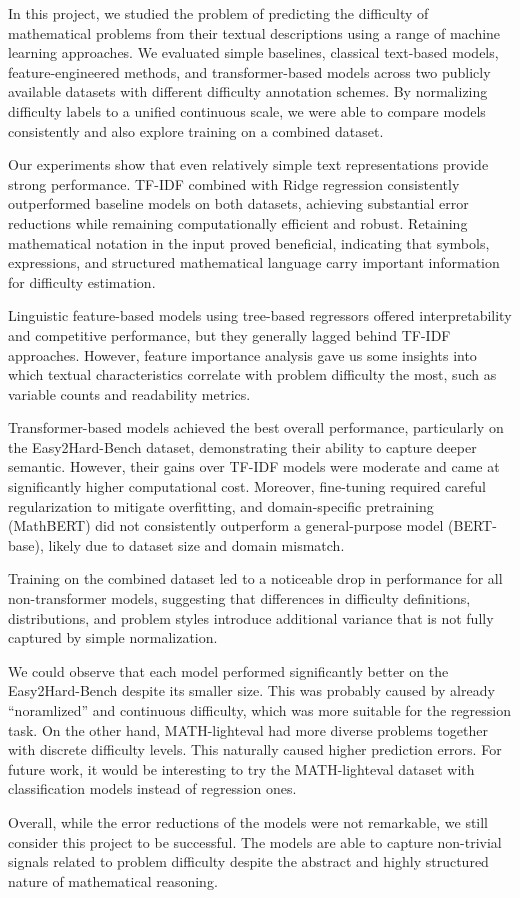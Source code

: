 \documentclass[runningheads]{llncs}
\begin{document}
In this project, we studied the problem of predicting the difficulty of mathematical problems from their textual descriptions using a range of machine learning approaches. We evaluated simple baselines, classical text-based models, feature-engineered methods, and transformer-based models across two publicly available datasets with different difficulty annotation schemes. By normalizing difficulty labels to a unified continuous scale, we were able to compare models consistently and also explore training on a combined dataset.

Our experiments show that even relatively simple text representations provide strong performance. TF-IDF combined with Ridge regression consistently outperformed baseline models on both datasets, achieving substantial error reductions while remaining computationally efficient and robust. Retaining mathematical notation in the input proved beneficial, indicating that symbols, expressions, and structured mathematical language carry important information for difficulty estimation.

Linguistic feature-based models using tree-based regressors offered interpretability and competitive performance, but they generally lagged behind TF-IDF approaches. However, feature importance analysis gave us some insights into which textual characteristics correlate with problem difficulty the most, such as variable counts and readability metrics.

Transformer-based models achieved the best overall performance, particularly on the Easy2Hard-Bench dataset, demonstrating their ability to capture deeper semantic. However, their gains over TF-IDF models were moderate and came at significantly higher computational cost. Moreover, fine-tuning required careful regularization to mitigate overfitting, and domain-specific pretraining (MathBERT) did not consistently outperform a general-purpose model (BERT-base), likely due to dataset size and domain mismatch.

Training on the combined dataset led to a noticeable drop in performance for all non-transformer models, suggesting that differences in difficulty definitions, distributions, and problem styles introduce additional variance that is not fully captured by simple normalization.

We could observe that each model performed significantly better on the Easy2Hard-Bench despite its smaller size. This was probably caused by already ``noramlized'' and continuous difficulty, which was more suitable for the regression task. On the other hand, MATH-lighteval had more diverse problems together with discrete difficulty levels. This naturally caused higher prediction errors. For future work, it would be interesting to try the MATH-lighteval dataset with classification models instead of regression ones.

Overall, while the error reductions of the models were not remarkable, we still consider this project to be successful. The models are able to capture non-trivial signals related to problem difficulty despite the abstract and highly structured nature of mathematical reasoning.


\printbibliography
\end{document}
